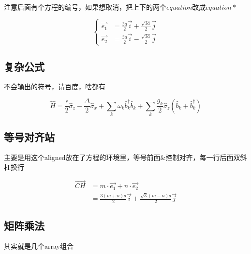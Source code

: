 \documentclass[AutoFakeBold]{LZUThesis2007}
\begin{document}
注意后面有个方程的编号，如果想取消，把上下的两个$equation$改成$equation*$

\begin{equation*}
    \left\{
    \begin{array}{rcl}
        \vec{e_1} &= \frac{3a}{2} \vec{i} + \frac{\sqrt{3a}}{2} \vec{j} \\
        \vec{e_2} &= \frac{3a}{2} \vec{i} - \frac{\sqrt{3a}}{2} \vec{j}
    \end{array}
    \right.
    \label{e1e2_2}
\end{equation*}


\subsection{复杂公式} %
\label{sub:复杂公式}
不会输出的符号，请百度，啥都有

\begin{equation}
\hat{H}=\frac{\epsilon}{2}\hat{\sigma}_{z}-\frac{\Delta}{2}\hat{\sigma}_{x}+\sum_{k}\omega_{k}\hat{b}_{k}^{\dagger}\hat{b}_{k}+\sum_{k}\frac{g_{k}}{2}\hat{\sigma}_{z}(\hat{b}_{k}+\hat{b}_{k}^{\dagger})\label{eq:sbm}
\end{equation}



\subsection{等号对齐站} %
\label{sub:等号对齐站}

主要是用这个aligned放在了方程的环境里，等号前面\&控制对齐，每一行后面双斜杠换行

\begin{equation}
    \begin{aligned}
        \vec{CH} & = m\cdot \vec{e_1} + n\cdot \vec{e_2} \\
        & = \frac{3(m+n)a}{2} \vec{i} + \frac{\sqrt{3}(m-n)a}{2} \vec{j} 
    \end{aligned}
    \label{ch}
\end{equation}


\subsection{矩阵乘法} %
\label{sub:矩阵乘法}

其实就是几个array组合
\end{document}
